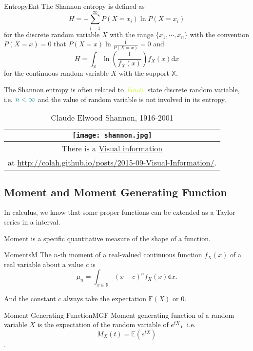 \documentclass[titlestyle=hang,11pt]{elegantbook}
\begin{document}
\begin{definition}{Entropy}{Ent}
The Shannon entropy is defined as
 $$ H=-\sum_{i=1}^{\infty}P(X=x_i){\ln}P(X=x_i) $$
for the discrete random variable $X$ with the range $\{x_1,\cdots, x_n\}$ with the convention $P(X=x)=0$ that $P(X=x){\ln}{\frac{1}{P(X=x)}}=0$ and
 $$ H=\int_{\mathbb{X}}{\ln}(\frac{1}{f_X(x)})f_X(x)\mathrm{d}x $$
for the continuous random variable $X$ with the support $\mathbb{X}$.
\end{definition}

The Shannon entropy is often related to $\color{lime}{finite}$ state discrete random variable, i.e. $\color{teal}{n< \infty}$ and the value of random variable is not involved in its entropy.

\begin{table}[h]
	\centering
	\caption{Claude Elwood Shannon, 1916-2001}
	\begin{tabular}{|c|}
		\hline
		\texttt{[image: shannon.jpg]}  \\
		\hline
		There is a \href{(http://colah.github.io/posts/2015-09-Visual-Information/}{Visual information} \\
        at \url{http://colah.github.io/posts/2015-09-Visual-Information/}. \\
		\hline
	\end{tabular}
\end{table}

\subsection{Moment and Moment Generating Function}

In calculus, we know that some proper functions can be extended as a Taylor series in a interval.

Moment  is a specific quantitative measure of the shape of a function.
\begin{definition}{Moments}{M}
The $n$-th moment of a real-valued continuous function $f_X(x)$ of a real variable about a value $c$ is
$$\mu_{n} =\int_{x\in\mathbb{R}}(x-c)^n f_X(x)\mathbb{d}x.$$
\end{definition}

And the constant $c$ always take the expectation $\mathbb{E}(X)$ or $0$.

\begin{definition}{Moment Generating Function}{MGF}
Moment generating function of a random variable $X$ is the expectation of the random variable of $e^{tX}$，i.e. $$M_X(t)=\mathbb{E}(e^{tX})$$.
\end{definition}
\end{document}
